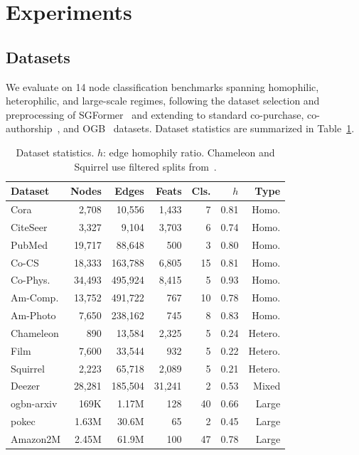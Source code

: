 \documentclass[sigconf]{acmart}
\begin{document}
\section{Experiments}

\subsection{Datasets}

We evaluate on 14 node classification benchmarks spanning homophilic, heterophilic, and large-scale regimes, following the dataset selection and preprocessing of SGFormer~\citep{wu2023sgformer} and extending to standard co-purchase, co-authorship~\citep{shchur2018pitfalls}, and OGB~\citep{hu2020ogb} datasets. Dataset statistics are summarized in Table~\ref{tab:datasets}.

\begin{table}[t]
\centering
\small
\begin{tabular}{lrrrrrr}
\toprule
\textbf{Dataset} & \textbf{Nodes} & \textbf{Edges} & \textbf{Feats} & \textbf{Cls.} & \textbf{$h$} & \textbf{Type} \\
\midrule
Cora       & 2,708  & 10,556  & 1,433  & 7  & 0.81 & Homo. \\
CiteSeer   & 3,327  & 9,104   & 3,703  & 6  & 0.74 & Homo. \\
PubMed     & 19,717 & 88,648  & 500    & 3  & 0.80 & Homo. \\
Co-CS      & 18,333 & 163,788 & 6,805  & 15 & 0.81 & Homo. \\
Co-Phys.   & 34,493 & 495,924 & 8,415  & 5  & 0.93 & Homo. \\
Am-Comp.   & 13,752 & 491,722 & 767    & 10 & 0.78 & Homo. \\
Am-Photo   & 7,650  & 238,162 & 745    & 8  & 0.83 & Homo. \\
Chameleon  & 890    & 13,584  & 2,325  & 5  & 0.24 & Hetero. \\
Film       & 7,600  & 33,544  & 932    & 5  & 0.22 & Hetero. \\
Squirrel   & 2,223  & 65,718  & 2,089  & 5  & 0.21 & Hetero. \\
Deezer     & 28,281 & 185,504 & 31,241 & 2  & 0.53 & Mixed \\
\midrule
ogbn-arxiv & 169K   & 1.17M   & 128    & 40 & 0.66 & Large \\
pokec      & 1.63M  & 30.6M   & 65     & 2  & 0.45 & Large \\
Amazon2M   & 2.45M  & 61.9M   & 100    & 47 & 0.78 & Large \\
\bottomrule
\end{tabular}
\caption{Dataset statistics. $h$: edge homophily ratio. Chameleon and Squirrel use filtered splits from~\citet{platonov2023critical}.}
\label{tab:datasets}
\end{table}
\end{document}
